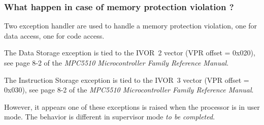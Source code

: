 \subsubsection{What happen in case of memory protection violation ?}

Two exception handler are used to handle a memory protection violation, one for data access, one for code access.

The Data Storage exception is tied to the IVOR~2 vector (VPR offset = 0x020), see page 8-2 of the {\em MPC5510 Microcontroller Family Reference Manual}.

The Instruction Storage exception is tied to the IVOR~3 vector (VPR offset = 0x030), see page 8-2 of the {\em MPC5510 Microcontroller Family Reference Manual}.

However, it appears one of these exceptions is raised when the processor is in user mode. The behavior is different in supervisor mode {\em to be completed}.

